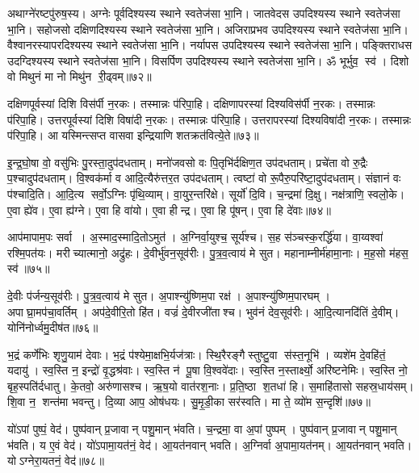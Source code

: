 अथाग्ने॑रष्टपु॑रुष॒स्य। 
अग्नेः पूर्वदिश्यस्य स्थाने स्वतेज॑सा भा॒नि। 
जातवेदस उपदिश्यस्य स्थाने स्वतेज॑सा भा॒नि। 
सहोजसो दक्षिणदिश्यस्य स्थाने स्वतेज॑सा भा॒नि। 
अजिराप्रभव उपदिश्यस्य स्थाने स्वतेज॑सा भा॒नि। 
वैश्वानरस्यापरदिश्यस्य स्थाने स्वतेज॑सा भा॒नि। 
नर्यापस उपदिश्यस्य स्थाने स्वतेज॑सा भा॒नि। 
पङ्क्तिराधस उदग्दिश्यस्य स्थाने स्वतेज॑सा भा॒नि। 
विसर्पिण उपदिश्यस्य स्थाने स्वतेज॑सा भा॒नि। 
ॐ भूर्भुव॒ स्व॑। दिशो वो मिथुनं मा नो मिथु॑न री॒ढ्वम्॥७२॥\anuvakamend


दक्षिणपूर्वस्यां दिशि विस॑र्पी न॒रकः। तस्मान्नः प॑रिपा॒हि। 
दक्षिणापरस्यां दिश्यविस॑र्पी न॒रकः। तस्मान्नः प॑रिपा॒हि। 
उत्तरपूर्वस्यां दिशि विषा॑दी न॒रकः। तस्मान्नः प॑रिपा॒हि। 
उत्तरापरस्यां दिश्यविषा॑दी न॒रकः। तस्मान्नः प॑रिपा॒हि। 
आ यस्मिन्त्सप्त वासवा इन्द्रियाणि शतक्रत॑वित्ये॒ते॥७३॥\anuvakamend


इ॒न्द्र॒घो॒षा वो॒ वसु॑भिः पु॒रस्ता॒दुप॑दधताम्‌। 
मनो॑जवसो वः पि॒तृभि॑र्दक्षिण॒त उप॑दधताम्‌। 
प्रचे॑ता वो रु॒द्रैः प॒श्चादुप॑दधताम्‌। 
वि॒श्वक॑र्मा व आदि॒त्यैरु॑त्तर॒त उप॑दधताम्‌। 
त्वष्टा॑ वो रू॒पैरु॒परि॑ष्टा॒दुप॑\-दधताम्‌। 
संज्ञानं वः प॑श्चादि॒ति। आ॒दि॒त्य सर्वो॒ऽग्निः पृ॑थि॒व्याम्‌। 
वा॒युर॒न्तरि॑क्षे। सूर्यो॑ दि॒वि। च॒न्द्रमा॑ दि॒क्षु। 
नक्ष॑त्राणि॒ स्वलो॒के। ए॒वा ह्ये॑व। ए॒वा ह्य॑ग्ने। 
ए॒वा हि वा॑यो। ए॒वा हीन्द्र। ए॒वा हि पू॑षन्‌। ए॒वा हि दे॑वाः॥७४॥\anuvakamend


आप॑मापाम॒पः सर्वा। अ॒स्माद॒स्मादि॒तोऽमुत॑।
अ॒ग्निर्वा॒युश्च॒ सूर्य॑श्च। स॒ह स॑ञ्चस्क॒रर्द्धि॑या। 
वा॒य्वश्वा॑ रश्मि॒पत॑यः। मरीच्यात्मानो॒ अद्रु॑हः। 
दे॒वीर्भु॑वन॒सूव॑रीः। पु॒त्र॒व॒त्वाय॑ मे सुत। 
महानाम्नीर्म॑हामा॒नाः। म॒ह॒सो म॑हस॒ स्व॑॥७५॥


दे॒वीः प॑र्जन्य॒सूव॑रीः। पु॒त्र॒व॒त्वाय॑ मे सुत। 
अ॒पाश्न्यु॑ष्णिम॒पा रक्ष॑। अ॒पाश्न्यु॑ष्णि\-म॒पारघम्। 
अपाघ्रा॒मप॑चा॒वर्तिम्। अप॑दे॒वीरि॒तो हि॑त। 
वज्रं॑ दे॒वीरजी॑ताश्च। भुव॑नं देव॒सूव॑रीः। 
आ॒दि॒त्यानदि॑तिं दे॒वीम्। योनि॑नोर्ध्वमु॒दीष॑त॥७६॥


भ॒द्रं कर्णे॑भिः शृणु॒याम॑ देवाः। भ॒द्रं प॑श्येमा॒क्षभि॒र्यज॑त्राः। 
स्थि॒रैरङ्गैस्तुष्टु॒वा स॑स्त॒नूभि॑। व्यशे॑म दे॒वहि॑तं॒ यदायु॑। 
स्व॒स्ति न॒ इन्द्रो॑ वृ॒द्धश्र॑वाः। स्व॒स्ति न॑ पू॒षा वि॒श्ववे॑दाः। 
स्व॒स्ति न॒स्तार्क्ष्यो॒ अरि॑ष्टनेमिः। स्व॒स्ति नो॒ बृह॒स्पति॑र्दधातु। 
के॒तवो॒ अरु॑णासश्च। ऋ॒ष॒यो वात॑रश॒नाः। 
प्र॒ति॒ष्ठा श॒तधा॑ हि। स॒माहि॑तासो सहस्र॒धाय॑सम्। 
शि॒वा न॒ शन्त॑मा भवन्तु। दि॒व्या आप॒ ओष॑धयः। 
सु॒मृ॒डी॒का सर॑स्वति। मा ते॒ व्यो॑म स॒न्दृशि॑॥७७॥\anuvakamend


यो॑ऽपां पुष्पं॒ वेद॑। पुष्प॑वान्‌ प्र॒जावान् पशु॒मान् भ॑वति। 
च॒न्द्रमा॒ वा अ॒पां पुष्पम्। पुष्प॑वान् प्र॒जावान् पशु॒मान्‌ भ॑वति। 
य ए॒वं वेद॑। यो॑ऽपामा॒यत॑नं॒ वेद॑। 
आ॒यत॑नवान्‌ भवति। अ॒ग्निर्वा अ॒पामा॒यत॑नम्। 
आ॒यत॑नवान्‌ भवति। योऽग्नेरा॒यतनं॒ वेद॑॥७८॥


